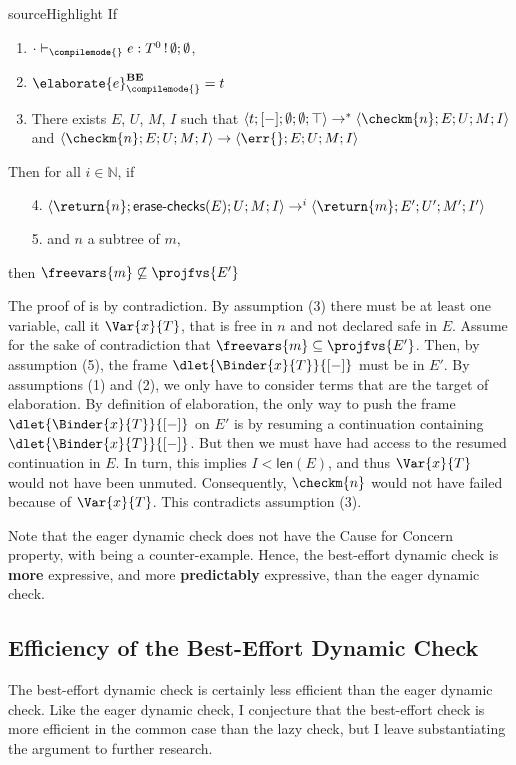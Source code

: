 \begin{theorem}{sourceHighlight}\label{thm:best-effort-cause-for-concern} If 
  \begin{enumerate}
    \item $\cdot \vdash_{\compilemode{}} e: T^0 \, ! \, \emptyset;\emptyset$, 
    \item $\elaborate{e}_{\compilemode{}}^{\textbf{BE}} = t$
    \item There exists $E$, $U$, $M$, $I$ such that $\langle t; [-];\emptyset; \emptyset; \top \rangle \to^{*}\langle \checkm{n}; E; U; M; I \rangle$
    and $\langle \checkm{n}; E; U; M; I \rangle \to \langle \err{}; E; U; M; I \rangle$
  \end{enumerate}
Then for all $i \in \mathbb{N}$, if 
\begin{enumerate}
  \item[4.] $\langle \return{n}; \textsf{erase-checks}(E); U; M; I \rangle \to^{i} \langle \return{m}; E'; U'; M'; I' \rangle$
  \item[5.] and $n$ a subtree of $m$,  
\end{enumerate}
then $\freevars{m} \not\subseteq \projfvs{E'}$  
\end{theorem}

The proof of  is by contradiction. By assumption (3) there must be at least one variable, call it $\Var{x}{T}$, that is free in $n$ and not declared safe in $E$. Assume for the sake of contradiction that $\freevars{m} \subseteq \projfvs{E'}$. Then, by assumption (5), the frame $\dlet{\Binder{x}{T}}{[-]}$ must be in $E'$. By assumptions (1) and (2), we only have to consider terms that are the target of elaboration. By definition of elaboration, the only way to push the frame $\dlet{\Binder{x}{T}}{[-]}$ on $E'$ is by resuming a continuation containing $\dlet{\Binder{x}{T}}{[-]}$. But then we must have had access to the resumed continuation in $E$. In turn, this implies $I < \textsf{len}(E)$, and thus $\Var{x}{T}$ would not have been unmuted. Consequently, $\checkm{n}$ would not have failed because of $\Var{x}{T}$. This contradicts assumption (3). 

Note that the eager dynamic check does not have the Cause for Concern property, with  being a counter-example. Hence, the best-effort dynamic check is \textbf{more} expressive, and more \textbf{predictably} expressive, than the eager dynamic check. 

\subsection{Efficiency of the Best-Effort Dynamic Check}\label{subsection:best-effort-efficient}
The best-effort dynamic check is certainly less efficient than the eager dynamic check. Like the eager dynamic check, I conjecture that the best-effort check is more efficient in the common case than the lazy check, but I leave substantiating the argument to further research.

